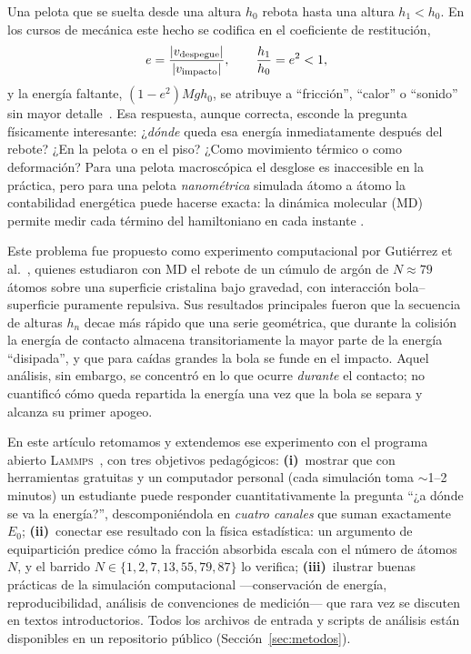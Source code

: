 \documentclass[10pt,a4paper,twocolumn]{article}
\newcommand{\lammps}{\textsc{Lammps}}
\begin{document}
Una pelota que se suelta desde una altura $h_0$ rebota hasta una altura
$h_1<h_0$. En los cursos de mecánica este hecho se codifica en el
coeficiente de restitución,
\begin{equation}
    e = \frac{|v_{\rm despegue}|}{|v_{\rm impacto}|}, \qquad
    \frac{h_1}{h_0} = e^2 < 1,
    \label{eq:cor}
\end{equation}
y la energía faltante, $(1-e^2)Mgh_0$, se atribuye a ``fricción'',
``calor'' o ``sonido'' sin mayor detalle~\cite{Cross1999,Aguiar2003}.
Esa respuesta, aunque correcta, esconde la pregunta físicamente
interesante: ¿\emph{dónde} queda esa energía inmediatamente después del
rebote? ¿En la pelota o en el piso? ¿Como movimiento térmico o como
deformación? Para una pelota macroscópica el desglose es inaccesible en la
práctica, pero para una pelota \emph{nanométrica} simulada átomo a átomo
la contabilidad energética puede hacerse exacta: la dinámica molecular
(MD) permite medir cada término del hamiltoniano en cada instante
\cite{AllenTildesley,FrenkelSmit}.

Este problema fue propuesto como experimento computacional por Gutiérrez
et al.~\cite{Gutierrez2012}, quienes estudiaron con MD el rebote de un
cúmulo de argón de $N\approx79$ átomos sobre una superficie cristalina
bajo gravedad, con interacción bola--superficie puramente repulsiva. Sus
resultados principales fueron que la secuencia de alturas $h_n$ decae más
rápido que una serie geométrica, que durante la colisión la energía de
contacto almacena transitoriamente la mayor parte de la energía
``disipada'', y que para caídas grandes la bola se funde en el impacto.
Aquel análisis, sin embargo, se concentró en lo que ocurre \emph{durante}
el contacto; no cuantificó cómo queda repartida la energía una vez que la
bola se separa y alcanza su primer apogeo.

En este artículo retomamos y extendemos ese experimento con el programa
abierto \lammps~\cite{Thompson2022}, con tres objetivos pedagógicos:
\textbf{(i)}~mostrar que con herramientas gratuitas y un computador
personal (cada simulación toma $\sim$1--2 minutos) un estudiante puede
responder cuantitativamente la pregunta ``¿a dónde se va la energía?'',
descomponiéndola en \emph{cuatro canales} que suman exactamente $E_0$;
\textbf{(ii)}~conectar ese resultado con la física estadística: un
argumento de equipartición predice cómo la fracción absorbida escala con
el número de átomos $N$, y el barrido $N\in\{1,2,7,13,55,79,87\}$ lo
verifica; \textbf{(iii)}~ilustrar buenas prácticas de la simulación
computacional ---conservación de energía, reproducibilidad, análisis de
convenciones de medición--- que rara vez se discuten en textos
introductorios. Todos los archivos de entrada y scripts de análisis están
disponibles en un repositorio público (Sección~\ref{sec:metodos}).
\end{document}
